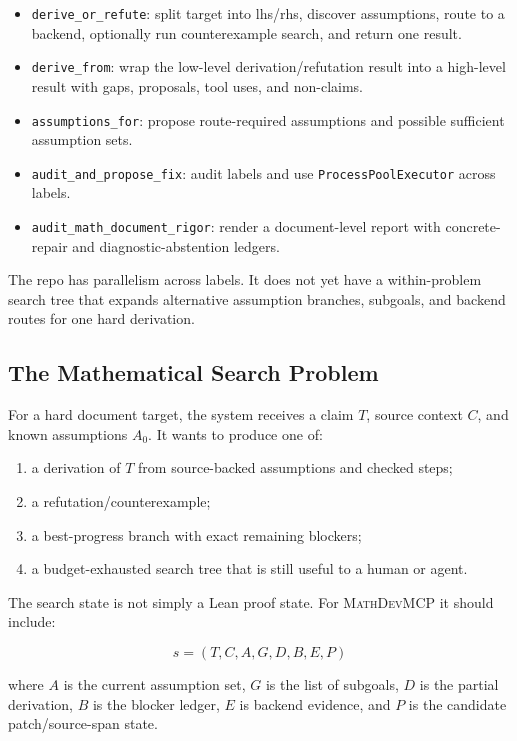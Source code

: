 \documentclass[11pt]{article}
\newcommand{\MathDevMCP}{\textsc{MathDevMCP}}
\begin{document}
\begin{itemize}[leftmargin=*]
\item \texttt{derive\_or\_refute}: split target into lhs/rhs, discover
  assumptions, route to a backend, optionally run counterexample search, and
  return one result.
\item \texttt{derive\_from}: wrap the low-level derivation/refutation result
  into a high-level result with gaps, proposals, tool uses, and non-claims.
\item \texttt{assumptions\_for}: propose route-required assumptions and
  possible sufficient assumption sets.
\item \texttt{audit\_and\_propose\_fix}: audit labels and use
  \texttt{ProcessPoolExecutor} across labels.
\item \texttt{audit\_math\_document\_rigor}: render a document-level report
  with concrete-repair and diagnostic-abstention ledgers.
\end{itemize}

The repo has parallelism across labels. It does not yet have a within-problem
search tree that expands alternative assumption branches, subgoals, and backend
routes for one hard derivation.

\subsection{The Mathematical Search Problem}

For a hard document target, the system receives a claim \(T\), source context
\(C\), and known assumptions \(A_0\). It wants to produce one of:

\begin{enumerate}[leftmargin=*]
\item a derivation of \(T\) from source-backed assumptions and checked steps;
\item a refutation/counterexample;
\item a best-progress branch with exact remaining blockers;
\item a budget-exhausted search tree that is still useful to a human or agent.
\end{enumerate}

The search state is not simply a Lean proof state. For \MathDevMCP{} it should
include:

\[
  s = (T, C, A, G, D, B, E, P)
\]

where \(A\) is the current assumption set, \(G\) is the list of subgoals,
\(D\) is the partial derivation, \(B\) is the blocker ledger, \(E\) is backend
evidence, and \(P\) is the candidate patch/source-span state.
\end{document}
